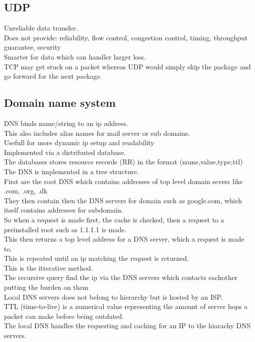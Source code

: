 \documentclass[12pt, a4paper]{article}
\begin{document}
		\subsection{UDP}
			Unreliable data transfer.\\
			Does not provide: reliability, flow control, congestion control, timing, throughput guarantee, security\\
			Smarter for data which can handler larger loss. \\
			TCP may get stuck on a packet whereas UDP would simply skip the package and go forward for the next package.\\
		\subsection{Domain name system}
			DNS binds name/string to an ip address.\\
			This also includes alias names for mail server or sub domains.\\
			Usefull for more dynamic ip setup and readability\\
			Implemented via a distributed database.\\
			The databases stores resource records (RR) in the format (name,value,type,ttl)\\
			The DNS is implemented in a tree structure.\\
			First are the root DNS which contains addresses of top level domain severs like .com, .org, .dk\\
			They then contain then the DNS servers for domain such as google.com, which itself contains addresses for subdomain.\\
			So when a request is made first, the cache is checked, then a request to a preinstalled root such as 1.1.1.1 is made.\\
			This then returns a top level address for a DNS server, which a request is made to. \\
			This is repeated until an ip matching the request is returned.\\
			This is the itterative method.\\
			The recursive query find the ip via the DNS servers which contacts eachother putting the burden on them\\
			Local DNS servers does not belong to hierarchy but is hosted by an ISP.\\
			TTL (time-to-live) is a numerical value representing the amount of server hops a packet can make before being outdated.\\	
			The local DNS handles the requesting and caching for an IP to the hiarachy DNS servers.
\end{document}
